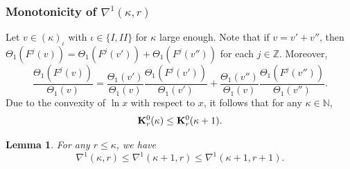 \documentclass{amsart}
\newtheorem{Lemma}[Definition]{Lemma}
\theoremstyle{definition}
\begin{document}
\subsubsection{Monotonicity of $\nabla^1(\kappa,r)$}

Let $v\in (\kappa)_{\iota}$ with $\iota\in \{I, II\}$ for $\kappa$ large enough. Note that if $v=v'+v''$, then $\Theta_1(F^j(v))=\Theta_1(F^j(v'))+\Theta_1(F^j(v''))$ for each $j\in \mathbb{Z}$. Moreover,
\[\frac{\Theta_1(F^{j}(v))}{\Theta_1(v)}=\frac{\Theta_1(v')}{\Theta_1(v)}\frac{\Theta_1(F^{j}(v'))}{\Theta_1(v')}+\frac{\Theta_1(v'')}{\Theta_1(v)}
\frac{\Theta_1(F^{j}(v''))}{\Theta_1(v'')}.\]
Due to the convexity of  $\ln x$ with respect to $x$, it follows that for any $\kappa\in\mathbb{N}$,
\begin{equation}\label{kinc}
\bold{K}_r^0(\kappa)\leq \bold{K}_r^0(\kappa+1).
\end{equation}

\begin{Lemma}\label{A1}
For any $r\leq \kappa$, we have
\[\nabla^1(\kappa,r)\leq \nabla^1(\kappa+1,r)\leq \nabla^1(\kappa+1,r+1).\]
\end{Lemma}
\end{document}
